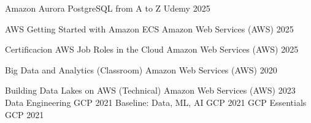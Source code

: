 

\begin{cvhonors}

  \cvhonor
    {Amazon Aurora PostgreSQL from A to Z} %
    {Udemy} %
    {} %
    {2025} %

  \cvhonor
    {AWS Getting Started with Amazon ECS} %
    {Amazon Web Services (AWS)} %
    {} %
    {2025} %

  \cvhonor
    {Certificacion AWS Job Roles in the Cloud} %
    {Amazon Web Services (AWS)} %
    {} %
    {2025} %

  \cvhonor
    {Big Data and Analytics (Classroom)} %
    {Amazon Web Services (AWS)} %
    {} %
    {2020} %

  \cvhonor
    {Building Data Lakes on AWS (Technical)} %
    {Amazon Web Services (AWS)} %
    {} %
    {2023} %
  \cvhonor
    {Data Engineering} %
    {GCP} %
    {} %
    {2021} %
  \cvhonor
    {Baseline: Data, ML, AI} %
    {GCP} %
    {} %
    {2021} %
  \cvhonor
    {GCP Essentials} %
    {GCP} %
    {} %
    {2021} %
\end{cvhonors}

